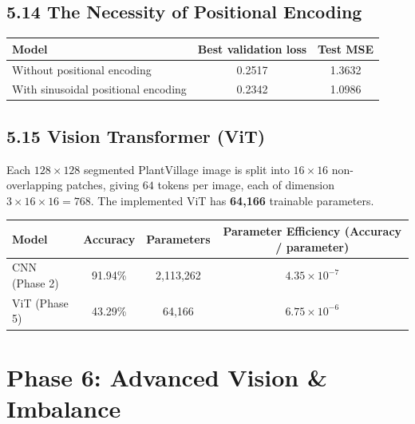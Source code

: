 \documentclass[12pt,a4paper]{article}
\begin{document}
\subsection{5.14 The Necessity of Positional Encoding}
\vspace{6pt}
\begin{resultbox}
\begin{center}
\begin{tabular}{lcc}
\toprule
Model & Best validation loss & Test MSE \\
\midrule
Without positional encoding & 0.2517 & 1.3632 \\
With sinusoidal positional encoding & 0.2342 & 1.0986 \\
\bottomrule
\end{tabular}
\end{center}
\end{resultbox}

\subsection{5.15 Vision Transformer (ViT)}
\begin{resultbox}
Each $128\times128$ segmented PlantVillage image is split into $16\times16$ non-overlapping patches, giving $64$ tokens per image, each of dimension $3\times16\times16=768$. The implemented ViT has \textbf{64,166} trainable parameters.

\begin{center}
\begin{tabular}{lccc}
\toprule
Model & Accuracy & Parameters & Parameter Efficiency (Accuracy / parameter) \\
\midrule
CNN (Phase 2) & 91.94\% & 2,113,262 & $4.35\times 10^{-7}$ \\
ViT (Phase 5) & 43.29\% & 64,166 & $6.75\times 10^{-6}$ \\
\bottomrule
\end{tabular}
\end{center}
\end{resultbox}

\section{Phase 6: Advanced Vision \& Imbalance}
\end{document}
